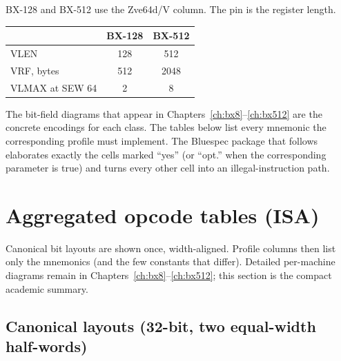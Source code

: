 BX-128 and BX-512 use the Zve64d/V column. The pin is the register length.

\begin{center}
\small
\begin{tabular}{@{}lcc@{}}
\toprule
 & BX-128 & BX-512 \\
\midrule
VLEN & 128 & 512 \\
VRF, bytes & 512 & 2048 \\
VLMAX at SEW 64 & 2 & 8 \\
\bottomrule
\end{tabular}
\end{center}

The bit-field diagrams that appear in Chapters~\ref{ch:bx8}--\ref{ch:bx512} are the concrete encodings for each class. The tables below list every mnemonic the corresponding profile must implement. The Bluespec package that follows elaborates exactly the cells marked “yes” (or “opt.” when the corresponding parameter is true) and turns every other cell into an illegal-instruction path.

\section{Aggregated opcode tables (ISA)}

Canonical bit layouts are shown once, width-aligned. Profile columns then list only the mnemonics (and the few constants that differ). Detailed per-machine diagrams remain in Chapters~\ref{ch:bx8}--\ref{ch:bx512}; this section is the compact academic summary.

\subsection{Canonical layouts (32-bit, two equal-width half-words)}

